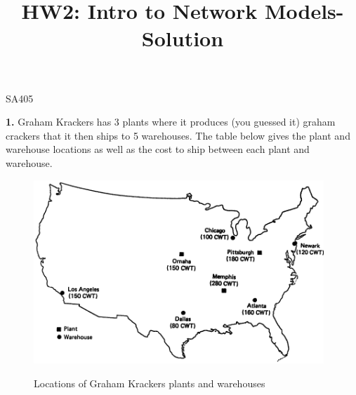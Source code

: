 \documentclass[11pt]{article}
\makeatletter
\theoremstyle{definition}
\renewcommand{\maketitle}{
  \noindent SA405 

  \begin{center}\Large{\textbf{\@title}}\end{center}
}
\makeatother
\begin{document}
\title{HW2: Intro to Network Models-Solution}

\maketitle

\textbf{1.} Graham Krackers has 3 plants where it produces (you guessed it) graham crackers that it then ships to 5 warehouses. The table below gives the plant and warehouse locations as well as the cost to ship between each plant and warehouse.

\begin{figure}[h!!!]
    \centering
    \includegraphics[width=4.3in]{map}\\
    \caption{Locations of Graham Krackers plants and warehouses}
\end{figure}
\end{document}
